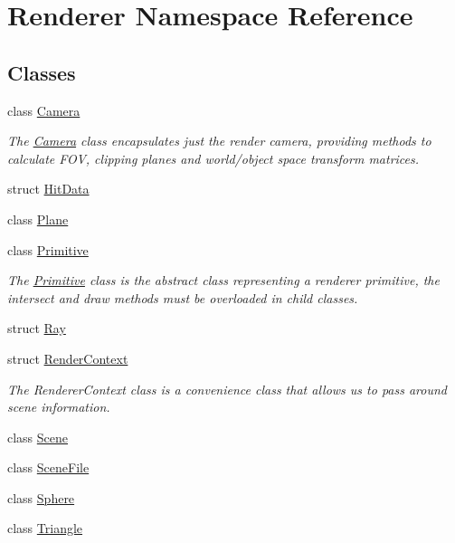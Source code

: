 \hypertarget{namespaceRenderer}{}\section{Renderer Namespace Reference}
\label{namespaceRenderer}
\subsection*{Classes}
\begin{DoxyCompactItemize}
\item 
class \hyperlink{classRenderer_1_1Camera}{Camera}
\begin{DoxyCompactList}\small\item\em The \hyperlink{classRenderer_1_1Camera}{Camera} class encapsulates just the render camera, providing methods to calculate F\+O\+V, clipping planes and world/object space transform matrices. \end{DoxyCompactList}\item 
struct \hyperlink{structRenderer_1_1HitData}{Hit\+Data}
\item 
class \hyperlink{classRenderer_1_1Plane}{Plane}
\item 
class \hyperlink{classRenderer_1_1Primitive}{Primitive}
\begin{DoxyCompactList}\small\item\em The \hyperlink{classRenderer_1_1Primitive}{Primitive} class is the abstract class representing a renderer primitive, the intersect and draw methods must be overloaded in child classes. \end{DoxyCompactList}\item 
struct \hyperlink{structRenderer_1_1Ray}{Ray}
\item 
struct \hyperlink{structRenderer_1_1RenderContext}{Render\+Context}
\begin{DoxyCompactList}\small\item\em The Renderer\+Context class is a convenience class that allows us to pass around scene information. \end{DoxyCompactList}\item 
class \hyperlink{classRenderer_1_1Scene}{Scene}
\item 
class \hyperlink{classRenderer_1_1SceneFile}{Scene\+File}
\item 
class \hyperlink{classRenderer_1_1Sphere}{Sphere}
\item 
class \hyperlink{classRenderer_1_1Triangle}{Triangle}
\end{DoxyCompactItemize}
